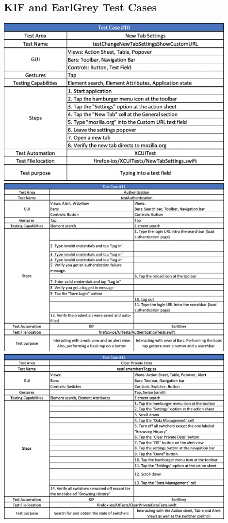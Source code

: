 \subsection{KIF and EarlGrey Test Cases}
\includegraphics[width=12cm]{img/tc10.png} \\[2mm]
\includegraphics[width=12cm]{img/tc11.png} \\[2mm]
\includegraphics[width=12cm]{img/tc12.png} \\[2mm]
